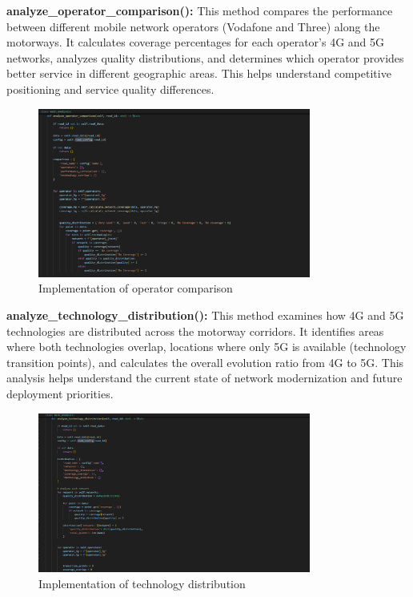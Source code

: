 \documentclass[MScCS]{uccthesis}
\begin{document}
\textbf{analyze\_operator\_comparison():}
This method compares the performance between different mobile network operators (Vodafone and Three) along the motorways. It calculates coverage percentages for each operator's 4G and 5G networks, analyzes quality distributions, and determines which operator provides better service in different geographic areas. This helps understand competitive positioning and service quality differences.

\begin{figure}[H]
   \centering
   \includegraphics[width=0.8\textwidth]{Images/analyze_operator_comparison.png}
   \caption{Implementation of operator comparison}
   \label{fig:analyze_operator_comparison}
   \end{figure}

\textbf{analyze\_technology\_distribution():}
This method examines how 4G and 5G technologies are distributed across the motorway corridors. It identifies areas where both technologies overlap, locations where only 5G is available (technology transition points), and calculates the overall evolution ratio from 4G to 5G. This analysis helps understand the current state of network modernization and future deployment priorities.

\begin{figure}[H]
   \centering
   \includegraphics[width=0.8\textwidth]{Images/analyze_technology_distribution.png}
   \caption{Implementation of technology distribution}
   \label{fig:analyze_technology_distribution.}
   \end{figure}
   
\end{document}
